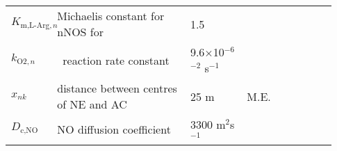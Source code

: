 \documentclass[fleqn]{report}
\numberwithin{equation}{section}
\numberwithin{equation}{section}
\newcommand{\nNOSact}{\text{nNOS$_{\text{act}}$}}
\newcommand{\LArg}{\text{L-Arg}}
\newcommand{\Otwo}{\text{O$_2$}}
\newcommand{\Ca}{\text{Ca$^{2+}$}}
\newcommand{\Can}{\text{[Ca$^{2+}]_n$}}
\newcommand{\NOn}{\text{[NO]$_n$}}
\newcommand{\uMpers}{\textmu M\,s$^{-1}$}
\newcommand\e[1]{$\times$10$^{#1}$}
\newcommand{\n}{$^{-1}$}
\newcommand\pNO[1]{\text{$p_{\text{NO},#1}$}}
\newcommand\cNO[1]{\text{$c_{\text{NO},#1}$}}
\newcommand\dNO[1]{\text{$d_{\text{NO},#1}$}}
\begin{document}
\begin{table}[p!]
\begin{tabular}{ p{0.09\linewidth}  >{\footnotesize} p{0.4\linewidth}  >{\footnotesize} p{0.17\linewidth} >{\footnotesize} p{0.27\linewidth} }
							$ K_{\text{m,L-Arg},n} $ 	& Michaelis constant for nNOS for \LArg 				& 1.5 \uM 			& \citep{Chen2006a} \\ %
							$ k_{\text{O2},n} $ 		& \Otwo\ reaction rate constant							& 9.6\e{-6} \uM$^{-2}$ s\n & \citep{Kavdia2002} \\ %
							$ x_{nk} $ 					& distance between centres of NE and AC  	& 25 \textmu m 		& M.E. \\ 
							$ D_{\text{c,NO}} $			& NO diffusion coefficient	& 3300 \textmu m$^2$s$^{-1}$  	& \citep{Malinski1993}\\
							\hline
						\end{tabular}
					\end{table}					
%					   
%					         			
\end{document}
